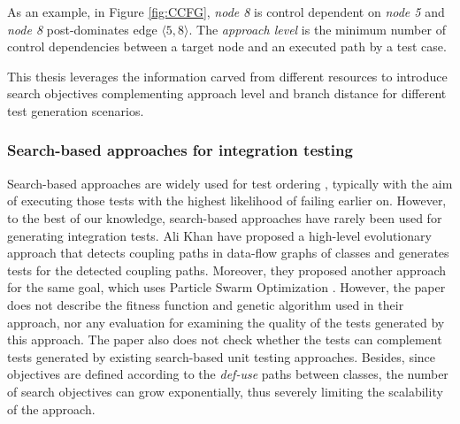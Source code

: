 %
As an example, in Figure \ref{fig:CCFG}, \textit{node 8} is control dependent on \textit{node 5} and \textit{node 8} post-dominates edge $\langle 5,8\rangle$. %
The \textit{approach level} is the minimum number of control dependencies between a target node and an executed path by a test case. 

This thesis leverages the information carved from different resources to introduce search objectives complementing approach level and branch distance for different test generation scenarios. 

\subsubsection{Search-based approaches for integration testing}

Search-based approaches are widely used for test ordering \cite{Wang2010, Steindl2012, Hashim2005, Vergilio2012, Bansal2009, JIiang2019, Borner2009, Mariani2016, Guizzo2015, Abdurazik2009, DaVeigaCabral2010, Briand2003a, Vergilio2012}, typically with the aim of executing those tests with the highest likelihood of failing earlier on. %
However, to the best of our knowledge, search-based approaches have rarely been used for generating integration tests. Ali Khan \etal \cite{AliKhan2013} have proposed a high-level evolutionary approach that detects coupling paths in data-flow graphs of classes and generates tests for the detected coupling paths. Moreover, they proposed another approach for the same goal, which uses Particle Swarm Optimization \cite{Khan2014}. However, the paper does not describe the fitness function and genetic algorithm used in their approach, nor any evaluation for examining the quality of the tests generated by this approach. 
The paper also does not check whether the tests can complement tests generated by existing search-based unit testing approaches. Besides, since objectives are defined according to the \textit{def-use} paths between classes, the number of search objectives can grow exponentially, thus severely limiting the scalability of the approach.

